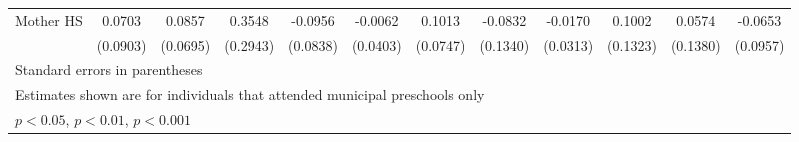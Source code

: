 \begin{table}[htbp]
\begin{tabular}{l*{11}{c}}
\addlinespace
Mother HS   &      0.0703         &      0.0857         &      0.3548         &     -0.0956         &     -0.0062         &      0.1013         &     -0.0832         &     -0.0170         &      0.1002         &      0.0574         &     -0.0653         \\
            &    (0.0903)         &    (0.0695)         &    (0.2943)         &    (0.0838)         &    (0.0403)         &    (0.0747)         &    (0.1340)         &    (0.0313)         &    (0.1323)         &    (0.1380)         &    (0.0957)         \\
\bottomrule
\multicolumn{12}{l}{\footnotesize Standard errors in parentheses}\\
\multicolumn{12}{l}{\footnotesize Estimates shown are for individuals that attended municipal preschools only}\\
\multicolumn{12}{l}{\footnotesize \sym{*} \(p<0.05\), \sym{**} \(p<0.01\), \sym{***} \(p<0.001\)}\\
\end{tabular}
\end{table}
